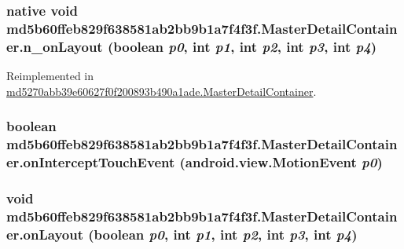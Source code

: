 \hypertarget{classmd5b60ffeb829f638581ab2bb9b1a7f4f3f_1_1_master_detail_container_a4ea06195f50a84c96f5163df0e39faa}{
\subsubsection[{n\_\-onLayout}]{\setlength{\rightskip}{0pt plus 5cm}native void md5b60ffeb829f638581ab2bb9b1a7f4f3f.MasterDetailContainer.n\_\-onLayout (boolean {\em p0}, \/  int {\em p1}, \/  int {\em p2}, \/  int {\em p3}, \/  int {\em p4})}}
\label{classmd5b60ffeb829f638581ab2bb9b1a7f4f3f_1_1_master_detail_container_a4ea06195f50a84c96f5163df0e39faa}




Reimplemented in \hyperlink{classmd5270abb39e60627f0f200893b490a1ade_1_1_master_detail_container_0582c744ccf98d251edbc86dec6b8feb}{md5270abb39e60627f0f200893b490a1ade.MasterDetailContainer}.\hypertarget{classmd5b60ffeb829f638581ab2bb9b1a7f4f3f_1_1_master_detail_container_e96ebc11fc79fa8ff77d7106dac3971a}{
\subsubsection[{onInterceptTouchEvent}]{\setlength{\rightskip}{0pt plus 5cm}boolean md5b60ffeb829f638581ab2bb9b1a7f4f3f.MasterDetailContainer.onInterceptTouchEvent (android.view.MotionEvent {\em p0})}}
\label{classmd5b60ffeb829f638581ab2bb9b1a7f4f3f_1_1_master_detail_container_e96ebc11fc79fa8ff77d7106dac3971a}


\hypertarget{classmd5b60ffeb829f638581ab2bb9b1a7f4f3f_1_1_master_detail_container_0ef2e1e3ab4836b6a210d6af09d780c6}{
\subsubsection[{onLayout}]{\setlength{\rightskip}{0pt plus 5cm}void md5b60ffeb829f638581ab2bb9b1a7f4f3f.MasterDetailContainer.onLayout (boolean {\em p0}, \/  int {\em p1}, \/  int {\em p2}, \/  int {\em p3}, \/  int {\em p4})}}
\label{classmd5b60ffeb829f638581ab2bb9b1a7f4f3f_1_1_master_detail_container_0ef2e1e3ab4836b6a210d6af09d780c6}




